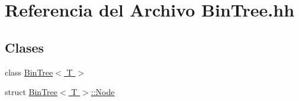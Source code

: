 \hypertarget{_bin_tree_8hh}{}\section{Referencia del Archivo Bin\+Tree.\+hh}
\label{_bin_tree_8hh}
\subsection*{Clases}
\begin{DoxyCompactItemize}
\item 
class \hyperlink{class_bin_tree}{Bin\+Tree$<$ T $>$}
\item 
struct \hyperlink{struct_bin_tree_1_1_node}{Bin\+Tree$<$ T $>$\+::\+Node}
\end{DoxyCompactItemize}
